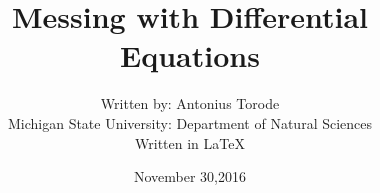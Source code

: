 \documentclass[a4paper,12pt]{book}
\begin{document}
\title{Messing with Differential Equations}
\author{Written by: Antonius Torode \\ Michigan State University: Department of Natural Sciences \\ Written in \LaTeX}
\date{November 30,2016}

\maketitle


\end{document}
